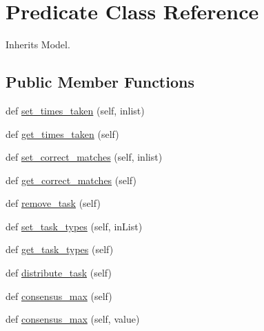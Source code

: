 \hypertarget{classdynamicfilterapp_1_1models_1_1_predicate}{}\section{Predicate Class Reference}
\label{classdynamicfilterapp_1_1models_1_1_predicate}


Inherits Model.

\subsection*{Public Member Functions}
\begin{DoxyCompactItemize}
\item 
def \mbox{\hyperlink{classdynamicfilterapp_1_1models_1_1_predicate_a4adcbbe0cf32ef383818ee9043e61628}{set\+\_\+times\+\_\+taken}} (self, inlist)
\item 
def \mbox{\hyperlink{classdynamicfilterapp_1_1models_1_1_predicate_aeb336756b1c72d57020a7b9f968b763e}{get\+\_\+times\+\_\+taken}} (self)
\item 
def \mbox{\hyperlink{classdynamicfilterapp_1_1models_1_1_predicate_a1e690d6df7dc40428d200ce0494eb72a}{set\+\_\+correct\+\_\+matches}} (self, inlist)
\item 
def \mbox{\hyperlink{classdynamicfilterapp_1_1models_1_1_predicate_ac0edbf94b370ed541539c84ecfede353}{get\+\_\+correct\+\_\+matches}} (self)
\item 
def \mbox{\hyperlink{classdynamicfilterapp_1_1models_1_1_predicate_a88c991de34eb29936f716526d4b7f86d}{remove\+\_\+task}} (self)
\item 
def \mbox{\hyperlink{classdynamicfilterapp_1_1models_1_1_predicate_a8883240ed027ae492e788dc7a24ef227}{set\+\_\+task\+\_\+types}} (self, in\+List)
\item 
def \mbox{\hyperlink{classdynamicfilterapp_1_1models_1_1_predicate_ab5ba298be003142db12f57fa67c40a66}{get\+\_\+task\+\_\+types}} (self)
\item 
def \mbox{\hyperlink{classdynamicfilterapp_1_1models_1_1_predicate_a2222560950a1e6f6b3a67c30d802c16e}{distribute\+\_\+task}} (self)
\item 
def \mbox{\hyperlink{classdynamicfilterapp_1_1models_1_1_predicate_a041df75dd2354ebd0b4802adfc96993e}{consensus\+\_\+max}} (self)
\item 
def \mbox{\hyperlink{classdynamicfilterapp_1_1models_1_1_predicate_ad8419218db77659995b89d783709d0f5}{consensus\+\_\+max}} (self, value)
\item 

\end{DoxyCompactItemize}

